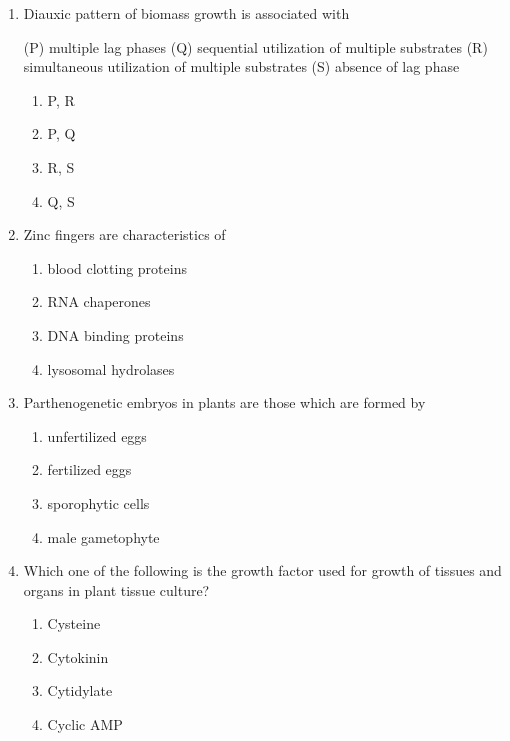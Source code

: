 \documentclass[journal,12pt,onecolumn]{IEEEtran}
\begin{document}
\begin{enumerate}
\item Diauxic pattern of biomass growth is associated with

(P) multiple lag phases  
(Q) sequential utilization of multiple substrates  
(R) simultaneous utilization of multiple substrates  
(S) absence of lag phase  

\begin{multicols}{2}
\begin{enumerate}[label=(\Alph*)]
    \item P, R
    \item P, Q
    \item R, S
    \item Q, S
\end{enumerate}
\end{multicols}

\item Zinc fingers are characteristics of
\begin{multicols}{2}
\begin{enumerate}[label=(\Alph*)]
    \item blood clotting proteins
    \item RNA chaperones
    \item DNA binding proteins
    \item lysosomal hydrolases
\end{enumerate}
\end{multicols}

\item Parthenogenetic embryos in plants are those which are formed by
\begin{multicols}{2}
\begin{enumerate}[label=(\Alph*)]
    \item unfertilized eggs
    \item fertilized eggs
    \item sporophytic cells
    \item male gametophyte
\end{enumerate}
\end{multicols}

\item Which one of the following is the growth factor used for growth of tissues and organs in plant tissue culture?
\begin{multicols}{2}
\begin{enumerate}[label=(\Alph*)]
    \item Cysteine
    \item Cytokinin
    \item Cytidylate
    \item Cyclic AMP
\end{enumerate}
\end{multicols}


\end{enumerate}
\end{document}
